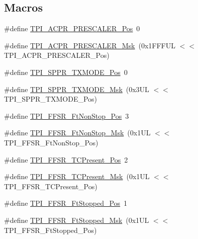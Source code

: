 \subsection*{Macros}
\begin{DoxyCompactItemize}
\item 
\#define \mbox{\hyperlink{group___c_m_s_i_s___t_p_i_ga5a82d274eb2df8b0c92dd4ed63535928}{T\+P\+I\+\_\+\+A\+C\+P\+R\+\_\+\+P\+R\+E\+S\+C\+A\+L\+E\+R\+\_\+\+Pos}}~0
\item 
\#define \mbox{\hyperlink{group___c_m_s_i_s___t_p_i_ga4fcacd27208419929921aec8457a8c13}{T\+P\+I\+\_\+\+A\+C\+P\+R\+\_\+\+P\+R\+E\+S\+C\+A\+L\+E\+R\+\_\+\+Msk}}~(0x1\+F\+F\+F\+U\+L $<$$<$ T\+P\+I\+\_\+\+A\+C\+P\+R\+\_\+\+P\+R\+E\+S\+C\+A\+L\+E\+R\+\_\+\+Pos)
\item 
\#define \mbox{\hyperlink{group___c_m_s_i_s___t_p_i_ga0f302797b94bb2da24052082ab630858}{T\+P\+I\+\_\+\+S\+P\+P\+R\+\_\+\+T\+X\+M\+O\+D\+E\+\_\+\+Pos}}~0
\item 
\#define \mbox{\hyperlink{group___c_m_s_i_s___t_p_i_gaca085c8a954393d70dbd7240bb02cc1f}{T\+P\+I\+\_\+\+S\+P\+P\+R\+\_\+\+T\+X\+M\+O\+D\+E\+\_\+\+Msk}}~(0x3\+U\+L $<$$<$ T\+P\+I\+\_\+\+S\+P\+P\+R\+\_\+\+T\+X\+M\+O\+D\+E\+\_\+\+Pos)
\item 
\#define \mbox{\hyperlink{group___c_m_s_i_s___t_p_i_ga9537b8a660cc8803f57cbbee320b2fc8}{T\+P\+I\+\_\+\+F\+F\+S\+R\+\_\+\+Ft\+Non\+Stop\+\_\+\+Pos}}~3
\item 
\#define \mbox{\hyperlink{group___c_m_s_i_s___t_p_i_gaaa313f980974a8cfc7dac68c4d805ab1}{T\+P\+I\+\_\+\+F\+F\+S\+R\+\_\+\+Ft\+Non\+Stop\+\_\+\+Msk}}~(0x1\+U\+L $<$$<$ T\+P\+I\+\_\+\+F\+F\+S\+R\+\_\+\+Ft\+Non\+Stop\+\_\+\+Pos)
\item 
\#define \mbox{\hyperlink{group___c_m_s_i_s___t_p_i_gad30fde0c058da2ffb2b0a213be7a1b5c}{T\+P\+I\+\_\+\+F\+F\+S\+R\+\_\+\+T\+C\+Present\+\_\+\+Pos}}~2
\item 
\#define \mbox{\hyperlink{group___c_m_s_i_s___t_p_i_ga0d6bfd263ff2fdec72d6ec9415fb1135}{T\+P\+I\+\_\+\+F\+F\+S\+R\+\_\+\+T\+C\+Present\+\_\+\+Msk}}~(0x1\+U\+L $<$$<$ T\+P\+I\+\_\+\+F\+F\+S\+R\+\_\+\+T\+C\+Present\+\_\+\+Pos)
\item 
\#define \mbox{\hyperlink{group___c_m_s_i_s___t_p_i_gaedf31fd453a878021b542b644e2869d2}{T\+P\+I\+\_\+\+F\+F\+S\+R\+\_\+\+Ft\+Stopped\+\_\+\+Pos}}~1
\item 
\#define \mbox{\hyperlink{group___c_m_s_i_s___t_p_i_ga1ab6c3abe1cf6311ee07e7c479ce5f78}{T\+P\+I\+\_\+\+F\+F\+S\+R\+\_\+\+Ft\+Stopped\+\_\+\+Msk}}~(0x1\+U\+L $<$$<$ T\+P\+I\+\_\+\+F\+F\+S\+R\+\_\+\+Ft\+Stopped\+\_\+\+Pos)
$$
\end{DoxyCompactItemize}
